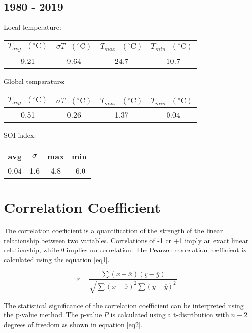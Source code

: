 \documentclass[12pt]{article}
\begin{document}
\subsection*{1980 - 2019}
Local temperature:
\begin{center}
\begin{tabular}{c | c | c | c}
	$T_{avg} \textrm{ } (^{\circ} \textrm{C})$ &
	$\sigma T \textrm{ } (^{\circ} \textrm{C})$ &
	$T_{max} \textrm{ } (^{\circ} \textrm{C})$ &
	$T_{min} \textrm{ } (^{\circ} \textrm{C})$ \\ %
	\hline
	9.21 & 9.64 & 24.7 & -10.7 \\ %
\end{tabular}
\end{center}
Global temperature:
\begin{center}
\begin{tabular}{c | c | c | c}
	$T_{avg} \textrm{ } (^{\circ} \textrm{C})$ &
	$\sigma T \textrm{ } (^{\circ} \textrm{C})$ &
	$T_{max} \textrm{ } (^{\circ} \textrm{C})$ &
	$T_{min} \textrm{ } (^{\circ} \textrm{C})$ \\ %
	\hline
	0.51 & 0.26 & 1.37 & -0.04 \\ %
\end{tabular}
\end{center}
SOI index:
\begin{center}
\begin{tabular}{c | c | c | c}
	avg & $\sigma$ & max & min \\ %
	\hline
	0.04 & 1.6 & 4.8 & -6.0 \\ %
\end{tabular}
\end{center}

\section*{Correlation Coefficient}
The correlation coefficient is a quantification of the
strength of the linear relationship between two variables.
Correlations of -1 or +1 imply an exact linear relationship,
while 0 implies no correlation.
The Pearson correlation coefficient is calculated using
the equation \ref{eq1}.

\begin{equation}\label{eq1}
	r = \frac{\sum (x - \overline{x}) (y - \overline{y})}
        {\sqrt{\sum (x - \overline{x})^2 \sum (y - \overline{y})^2}}
\end{equation}

The statistical significance of the correlation coefficient can be
interpreted using the p-value method.
The p-value $P$ is calculated using a t-distribution with
$n - 2$ degrees of freedom as shown in equation \ref{eq2}.
\end{document}
